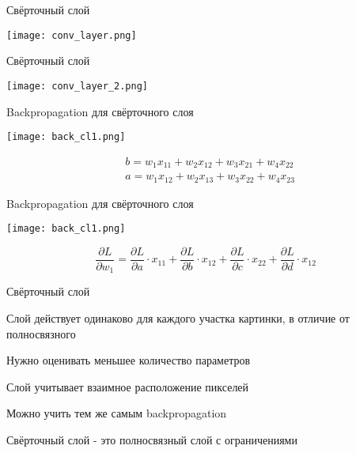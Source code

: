 \documentclass[notes,12pt, aspectratio=169]{beamer}
\newenvironment{wideitemize}{\itemize\addtolength{\itemsep}{10pt}}{\enditemize}
\begin{document}
\begin{frame}{Свёрточный слой}
\begin{center}
	\texttt{[image: conv\_layer.png]}
\end{center}
\end{frame}


\begin{frame}{Свёрточный слой}
\begin{center}
	\texttt{[image: conv\_layer\_2.png]}
\end{center}
\end{frame}


\begin{frame}{Backpropagation для свёрточного слоя}
\begin{center}
 \texttt{[image: back\_cl1.png]}
\end{center}


\begin{equation*}
\begin{aligned}
& b = w_1 x_{11} + w_2 x_{12} + w_3 x_{21} + w_4 x_{22} \\
& a = w_1 x_{12} + w_2 x_{13} + w_3 x_{22} + w_4 x_{23} 
\end{aligned}
\end{equation*}
\end{frame}


\begin{frame}{Backpropagation для свёрточного слоя}
\begin{center}
	\texttt{[image: back\_cl1.png]}
\end{center}

\[
\frac{\partial L}{\partial w_1} = \frac{ \partial L }{\partial a} \cdot x_{11} + \frac{ \partial L }{\partial b} \cdot x_{12} + \frac{ \partial L }{\partial c} \cdot x_{22}  + \frac{ \partial L }{\partial d} \cdot x_{12} 
\]
\end{frame}


\begin{frame}{Свёрточный слой}
\begin{wideitemize}
	\item  Слой действует одинаково для каждого участка картинки, в отличие от полносвязного 
	\item  Нужно оценивать меньшее количество параметров
	\item  Слой учитывает взаимное расположение пикселей
	\item  Можно учить тем же самым backpropagation 
	\item  Свёрточный слой -  это полносвязный слой с ограничениями
\end{wideitemize}
\end{frame}
\end{document}
